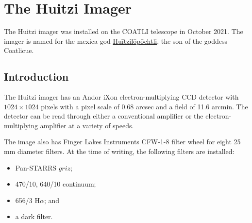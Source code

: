 
\chapter{The Huitzi Imager}

The Huitzi imager was installed on the COATLI telescope in October 2021. The imager is named for the mexica god \href{https://en.wikipedia.org/wiki/Huītzilōpōchtli}{Huītzilōpōchtli}, the son of the goddess Coatlicue.

\section{Introduction}

The Huitzi imager has an Andor iXon electron-multiplying CCD detector with $1024\times1024$ pixels with a pixel scale of 0.68 arcsec and a field of 11.6 arcmin. The detector can be read through either a conventional amplifier or the electron-multiplying amplifier at a variety of speeds.

The image also has Finger Lakes Instruments CFW-1-8 filter wheel for eight 25 mm diameter filters. At the time of writing, the following filters are installed:
\begin{itemize}
    \item Pan-STARRS $griz$;
    \item 470/10, 640/10 continuum;
    \item 656/3 H$\alpha$; and
    \item a dark filter.
\end{itemize}

